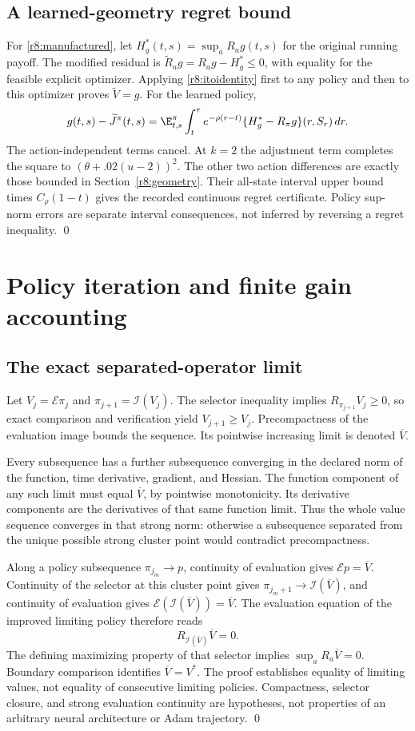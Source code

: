 \subsection{A learned-geometry regret bound}
For \eqref{r8:manufactured}, let $H_g^*(t,s)=\sup_a R_ag(t,s)$ for the original running payoff. The modified residual is $\widetilde R_ag=R_ag-H_g^*\leq0$, with equality for the feasible explicit optimizer. Applying \eqref{r8:itoidentity} first to any policy and then to this optimizer proves $\widetilde V=g$. For the learned policy,
\[
 g(t,s)-\widetilde J^\pi(t,s)
 =\E^\pi_{t,s}\int_t^\tau e^{-\rho(r-t)}\{H_g^*-R_\pi g\}(r,S_r)\,dr.
\]
The action-independent terms cancel. At $k=2$ the adjustment term completes the square to $(\theta+.02(u-2))^2$. The other two action differences are exactly those bounded in Section~\ref{r8:geometry}. Their all-state interval upper bound times $C_\rho(1-t)$ gives the recorded continuous regret certificate. Policy sup-norm errors are separate interval consequences, not inferred by reversing a regret inequality. \qed

\section{Policy iteration and finite gain accounting}\label{r8:proof:operators}
\subsection{The exact separated-operator limit}
Let $V_j=\mathcal E\pi_j$ and $\pi_{j+1}=\mathcal I(V_j)$. The selector inequality implies $R_{\pi_{j+1}}V_j\geq0$, so exact comparison and verification yield $V_{j+1}\geq V_j$. Precompactness of the evaluation image bounds the sequence. Its pointwise increasing limit is denoted $\overline V$.

Every subsequence has a further subsequence converging in the declared norm of the function, time derivative, gradient, and Hessian. The function component of any such limit must equal $\overline V$, by pointwise monotonicity. Its derivative components are the derivatives of that same function limit. Thus the whole value sequence converges in that strong norm: otherwise a subsequence separated from the unique possible strong cluster point would contradict precompactness.

Along a policy subsequence $\pi_{j_m}\to p$, continuity of evaluation gives $\mathcal Ep=\overline V$. Continuity of the selector at this cluster point gives $\pi_{j_m+1}\to\mathcal I(\overline V)$, and continuity of evaluation gives $\mathcal E(\mathcal I(\overline V))=\overline V$. The evaluation equation of the improved limiting policy therefore reads
\[
 R_{\mathcal I(\overline V)}\overline V=0.
\]
The defining maximizing property of that selector implies $\sup_aR_a\overline V=0$. Boundary comparison identifies $\overline V=V^*$. The proof establishes equality of limiting values, not equality of consecutive limiting policies. Compactness, selector closure, and strong evaluation continuity are hypotheses, not properties of an arbitrary neural architecture or Adam trajectory. \qed


